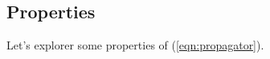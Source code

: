 \documentclass[../template.tex]{subfiles}
\begin{document}
\begin{comment}
By choosing $\lambda= 1/ \sqrt{t}$ we get:
\begin{align*}
    W(x,t|0,0) = \frac{1}{\sqrt{t}} W\left(\frac{x}{\sqrt{t}}, 1|0,0 \right) = \frac{1}{\sqrt{t}} f\left(\frac{x}{\sqrt{t}} \right) 
\end{align*}   
Note that this property can be derived even if we do not know the explicit solution:
\begin{align*}
    f(z) = \frac{1}{\sqrt{4 \pi D}} \exp\left(-\frac{z^2}{4D} \right) 
\end{align*}
In fact, by an argument of dimensional analysis, note that $[D] = L^2/t$, and so $[Dt] = [x^2]$. Recall that $[W] = 1/x$, as it is a pdf, and $W\dd{x}$ is a pure number. So:
\begin{align*}
    W(x,t|0,0) = \frac{1}{x} \frac{x}{\sqrt{D t}} ) = \frac{1}{\sqrt{Dt}} \underbrace{\frac{\sqrt{Dt}}{x} F \left(\frac{x}{\sqrt{Dt}} \right)}_{f(x/\sqrt{Dt})}  
\end{align*}  
where $F$ is dimensionless, and $1/x$ restores the correct dimensions.\\
But if we consider also the initial conditions, we have an extra parameter that can be added to the function:
\begin{align*}
    W(x,t|x_0, t_0)
\end{align*}
However, by translational invariance, we can simply translate time and space:
\begin{align*}
    W(x-x_0, t-t_0 | 0,0)
\end{align*}
\end{comment}

\subsection{Properties}
Let's explorer some properties of (\ref{eqn:propagator}).\\
\end{document}
